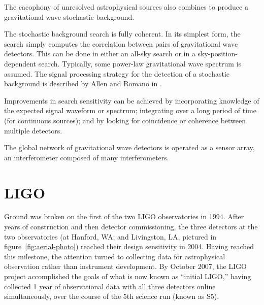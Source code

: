 \begin{itemize}
  The cacophony of unresolved astrophysical sources also combines
  to produce a gravitational wave stochastic background.   

  The stochastic background search is fully coherent.  In its simplest
  form, the search simply computes the correlation between pairs of
  gravitational wave detectors.  This can be done in either an all-sky
  search or in a sky-position-dependent search.  Typically, some
  power-law gravitational wave spectrum is assumed.
  The signal processing strategy for the detection of a stochastic background
  is described by Allen and Romano in \cite{Allen1999Detecting}.
\end{itemize}

Improvements in search sensitivity can be achieved by incorporating
knowledge of the expected signal waveform or spectrum; integrating
over a long period of time (for continuous sources); and by looking
for coincidence or coherence between multiple detectors.

The global network of gravitational wave detectors is operated as a
sensor array, an interferometer composed of many interferometers.

\section{LIGO}

Ground was broken on the first of the two LIGO observatories in 1994.
After years of construction and then detector commissioning, the three
detectors at the two observatories (at Hanford, WA; and Livingston, LA, 
pictured in figure~\ref{fig:aerial-photo}) reached their design sensitivity\cite{LigoSRD} in
2004\cite{Ballmer2006LIGO}.  Having reached this milestone, the attention turned to
collecting data for astrophysical observation rather than instrument
development.  By October 2007, the LIGO project accomplished the goals
of what is now known as ``initial LIGO,'' having collected 1 year of
observational data with all three detectors online simultaneously, over
the course of the 5th science run (known as S5).

